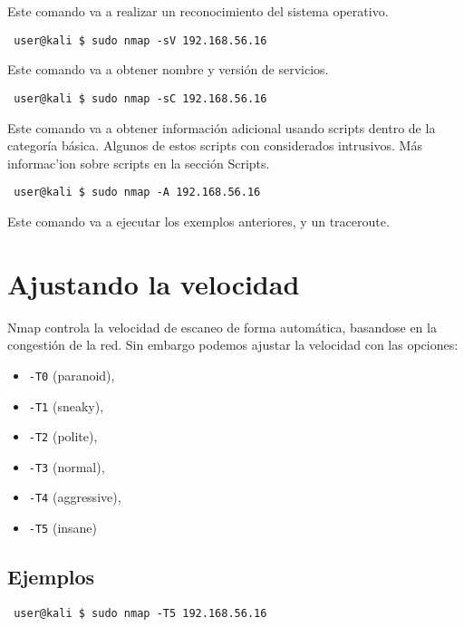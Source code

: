 \documentclass{article}
\begin{document}
Este comando va a realizar un reconocimiento del sistema operativo.\\

\begin{lstlisting}
 user@kali $ sudo nmap -sV 192.168.56.16
\end{lstlisting}

Este comando va a obtener nombre y versi\'on de servicios.\\

\begin{lstlisting}
 user@kali $ sudo nmap -sC 192.168.56.16
\end{lstlisting}

Este comando va a obtener informaci\'on adicional usando scripts dentro de la categor\'ia b\'asica. Algunos de estos scripts con considerados intrusivos. M\'as informac'ion sobre scripts en la secci\'on Scripts.\\

\begin{lstlisting}
 user@kali $ sudo nmap -A 192.168.56.16
\end{lstlisting}

Este comando va a ejecutar los exemplos anteriores, y un traceroute.\\

\section{Ajustando la velocidad}

Nmap controla la velocidad de escaneo de forma autom\'atica, basandose en la congesti\'on de la red. Sin embargo podemos ajustar la velocidad con las opciones:

\begin{itemize}
    \item \texttt{-T0} (paranoid), 
    \item \texttt{-T1} (sneaky), 
    \item \texttt{-T2} (polite),
    \item \texttt{-T3} (normal),
    \item \texttt{-T4} (aggressive),
    \item \texttt{-T5} (insane)
\end{itemize}

\subsection{Ejemplos}

\begin{lstlisting}
 user@kali $ sudo nmap -T5 192.168.56.16
\end{lstlisting}
\end{document}
